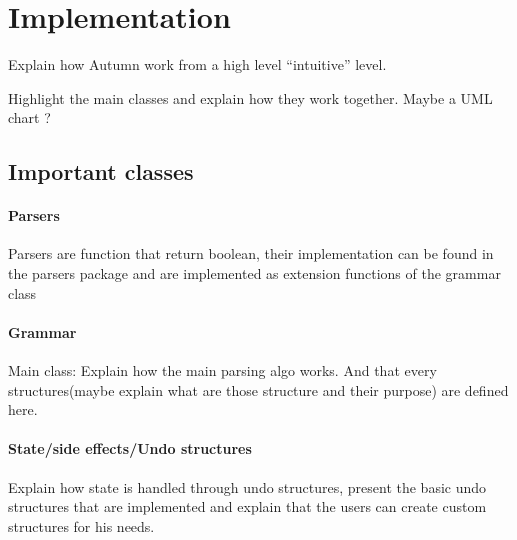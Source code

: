 
	\section{Implementation}
	Explain how Autumn work from a high level ``intuitive'' level.

	Highlight the main classes and explain how they work together. Maybe a UML chart ?
		\subsection{Important classes}

		\paragraph{Parsers} Parsers are function that return boolean, their implementation can be found in the parsers package and are implemented as extension functions of the grammar class
		\paragraph{Grammar} Main class: Explain how the main parsing algo works. And that every structures(maybe explain what are those structure and their purpose) are defined here.
		\paragraph{State/side effects/Undo structures} Explain how state is handled through undo structures, present the basic undo structures that are implemented and explain that the users can create custom structures for his needs.


